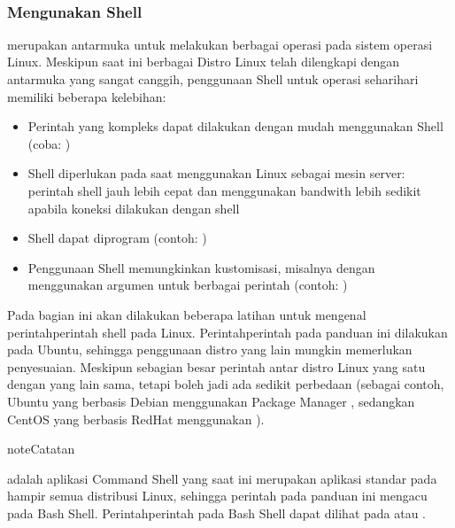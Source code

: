 \documentclass[letterpaper,10pt,english]{sphinxmanual}
\begin{document}
 


\subsubsection{Mengunakan Shell}
\label{\detokenize{sesi1/arsitektur:mengunakan-shell}}
 merupakan antarmuka untuk melakukan berbagai operasi pada sistem operasi Linux. Meskipun saat ini berbagai Distro Linux telah dilengkapi dengan antarmuka yang sangat canggih, penggunaan Shell untuk operasi sehari\sphinxhyphen{}hari memiliki beberapa kelebihan:
\begin{itemize}
\item {} 
Perintah yang kompleks dapat dilakukan dengan mudah menggunakan Shell (coba: )

\item {} 
Shell diperlukan pada saat menggunakan Linux sebagai mesin server: perintah shell jauh lebih cepat dan menggunakan bandwith lebih sedikit apabila koneksi dilakukan dengan shell

\item {} 
Shell dapat diprogram (contoh: )

\item {} 
Penggunaan Shell memungkinkan kustomisasi, misalnya dengan menggunakan argumen untuk berbagai perintah (contoh: )

\end{itemize}

Pada bagian ini akan dilakukan beberapa latihan untuk mengenal perintah\sphinxhyphen{}perintah shell pada Linux. Perintah\sphinxhyphen{}perintah pada panduan ini dilakukan pada Ubuntu, sehingga penggunaan distro yang lain mungkin memerlukan penyesuaian. Meskipun sebagian besar perintah antar distro Linux yang satu dengan yang lain sama, tetapi boleh jadi ada sedikit perbedaan (sebagai contoh, Ubuntu yang berbasis Debian menggunakan Package Manager , sedangkan CentOS yang berbasis RedHat menggunakan ).

\begin{sphinxadmonition}{note}{Catatan}

 adalah aplikasi Command Shell yang saat ini merupakan aplikasi standar pada hampir semua distribusi Linux, sehingga perintah pada panduan ini mengacu pada Bash Shell. Perintah\sphinxhyphen{}perintah pada Bash Shell dapat dilihat pada  atau .
\end{sphinxadmonition}
\end{document}
